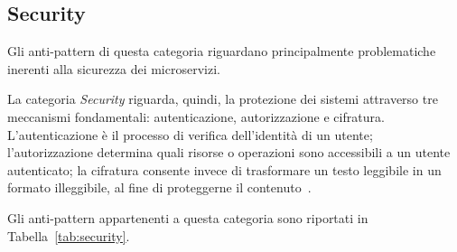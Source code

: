 \subsection{Security}

Gli anti-pattern di questa categoria riguardano principalmente problematiche inerenti alla sicurezza dei microservizi.

La categoria \textit{Security} riguarda, quindi, la protezione dei sistemi attraverso tre meccanismi fondamentali: autenticazione, autorizzazione e cifratura. L’autenticazione è il processo di verifica dell’identità di un utente; l’autorizzazione determina quali risorse o operazioni sono accessibili a un utente autenticato; la cifratura consente invece di trasformare un testo leggibile in un formato illeggibile, al fine di proteggerne il contenuto~\cite{CernyCatalogo}.

Gli anti-pattern appartenenti a questa categoria sono riportati in Tabella~\ref{tab:security}.

